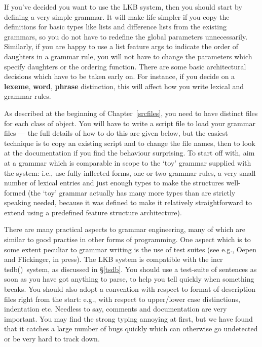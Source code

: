\documentclass[12pt]{report}
\newcommand{\itsdb}{{\sf \lbrack incr tsdb()\rbrack}}
\begin{document}
If you've decided you want to use the LKB system, then you should start by
defining a very simple grammar.  
It will make life simpler 
if you copy the definitions for basic types like lists and difference
lists from the existing grammars, so you do not have to redefine the
global parameters unnecessarily.  
Similarly, if you are happy to use a list feature {\sc args} to
indicate the order of daughters in a grammar rule, you will not
have to change the parameters which specify daughters or the
ordering function.
There are some basic architectural decisions
which have to be taken early on.  For instance, if you decide
on a {\bf lexeme}, {\bf word}, {\bf phrase} distinction, this will
affect how you write lexical and grammar rules.  

As described at the beginning of Chapter~\ref{srcfiles},
you need to have distinct files for each class of object. 
You will have to write a script 
file to load your grammar files --- the full details of how to
do this are given below, but the easiest technique is to copy
an existing script and to change the file names, then to look at the
documentation if you find the behaviour surprising.  To start off
with, aim at a grammar which is comparable in scope to the `toy' grammar
supplied with the system: i.e., use fully inflected forms, 
one or two grammar rules, a very small number
of lexical entries and just enough types to make the structures well-formed
(the `toy' grammar actually has many more types than are strictly 
speaking needed, because it was defined 
to make it relatively straightforward
to extend using a predefined feature structure architecture).

There are many practical aspects to grammar engineering, many of which
are similar to good practise in other forms of programming.
One aspect which is to some extent peculiar to grammar writing is the
use of test suites (see e.g., Oepen and Flickinger, in press).
The LKB system is compatible with the \itsdb\  system, as discussed
in \S\ref{tsdb}.
You should use a test-suite of sentences as soon as you have got
anything to parse, to
help you tell quickly when something breaks.  You should also
adopt a convention with respect to format of description files right
from the start: e.g., with respect to upper/lower case distinctions,
indentation etc.  Needless to say, comments 
and documentation are very important.  
You may find the strong typing annoying at first, but we have found that
it catches a large number of bugs quickly which can otherwise go undetected
or be very hard to track down.  
\end{document}
